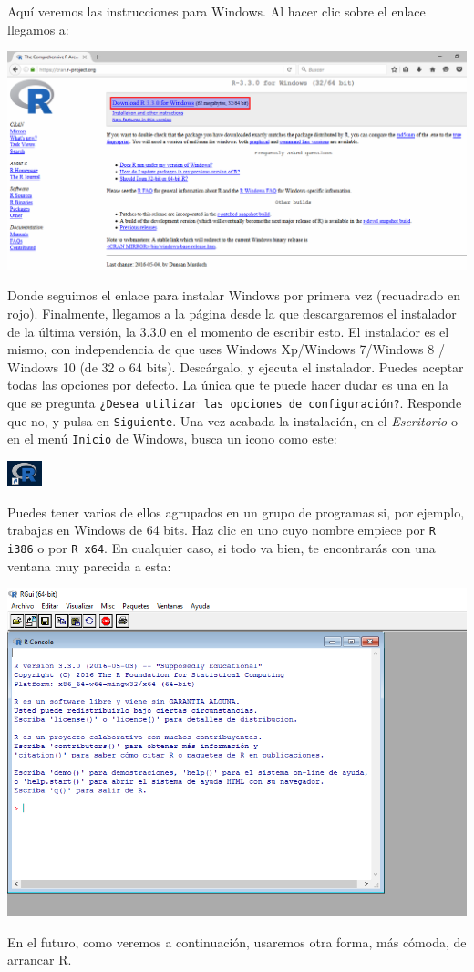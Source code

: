 \documentclass[10pt,a4paper]{article}
\newcounter {cont01}
\begin{document}
Aquí veremos las instrucciones para Windows. Al hacer clic sobre el enlace llegamos a:
    \begin{center}
    \includegraphics[width=15cm]{../fig/Tut00-37.png}
    \end{center}
Donde seguimos el enlace para instalar Windows por primera vez (recuadrado en rojo).
Finalmente, llegamos a la página desde la que descargaremos el instalador de la última versión, la
3.3.0 en el momento de escribir esto. El instalador es el
mismo, con independencia de que uses Windows Xp/Windows 7/Windows 8 / Windows 10 (de 32 o 64 bits). 
Descárgalo, y ejecuta el instalador. Puedes aceptar todas las opciones por defecto. La única que te
puede hacer dudar es una en la que se pregunta {\tt ¿Desea utilizar las opciones de
configuración?}. Responde que no, y pulsa en {\tt Siguiente}. Una vez acabada la instalación, en el
{\em Escritorio} o en el menú {\tt Inicio} de Windows, busca un icono como este:
    \begin{center}
    \includegraphics[width=1cm]{../fig/Tut00-38.png}
    \end{center}
Puedes tener varios de ellos agrupados en un grupo de programas si, por ejemplo, trabajas en Windows de
64 bits. Haz clic en uno cuyo nombre empiece por {\tt R i386} o por {\tt R x64}. En cualquier caso,
si todo va bien, te encontrarás con una ventana muy parecida a esta:
    \begin{center}
    \includegraphics[width=15cm]{../fig/Tut00-39.png}
    \end{center}
En el futuro, como veremos a continuación, usaremos otra forma, más cómoda, de arrancar R.
\end{document}
